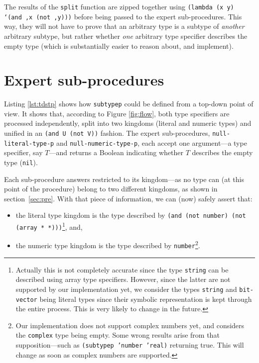 \documentclass[format=sigconf]{acmart}
\newcommand\code[2][\small]{\sloppy\texttt{#1#2}}
\newcommand\footcode[1]{\code[\scriptsize]{#1}}
\theoremstyle{definition}
\begin{document}
The results of the \code{split} function are zipped together using
\code{(lambda (x y) `(and ,x (not ,y)))} before being passed to the expert
sub-procedures. This way, they will not have to prove that an arbitrary type is a
subtype of \emph{another} arbitrary subtype, but rather whether \emph{one}
arbitrary type specifier describes the empty type (which is substantially
easier to reason about, and implement).

\section{Expert sub-procedures}
\label{sec:exp}
Listing \ref{lst:tdstp} shows how \code{subtypep} could be defined from a top-down
point of view. It shows that, according to Figure \ref{fig:flow}, both type
specifiers are processed independently, split into two kingdoms (literal and
numeric types) and unified in an \code{(and U (not V))} fashion. The
expert sub-procedures, \code{null-literal-type-p} and \code{null-numeric-type-p},
each accept one argument---a type specifier, say $T$---and returns a Boolean
indicating whether $T$ describes the empty type (\code{nil}).

Each sub-procedure answers restricted to its kingdom---as no type can (at this
point of the procedure) belong to two different kingdoms, as shown in
section~\ref{sec:pre}. With that piece of information, we can (now) safely assert
that:
\begin{itemize}
\item the literal type kingdom is the type described by \code{(and (not number)
    (not (array * *)))}\footnote{%
    Actually this is not completely accurate since the type \footcode{string}
    can be described using array type specifiers. However, since the latter are
    not supported by our implementation yet, we consider the types
    \footcode{string} and \footcode{bit-vector} being literal types since their
    symbolic representation is kept through the entire process. This is very
    likely to change in the future.
  }, and,
\item the numeric type kingdom is the type described by \code{number}\footnote{%
    Our implementation does not support complex numbers yet, and considers the
    \footcode{complex} type being empty. Some wrong results arise from that
    supposition---such as \footcode{(subtypep 'number 'real)} returning true.
    This will change as soon as complex numbers are supported.
  }.
\end{itemize}
\end{document}
